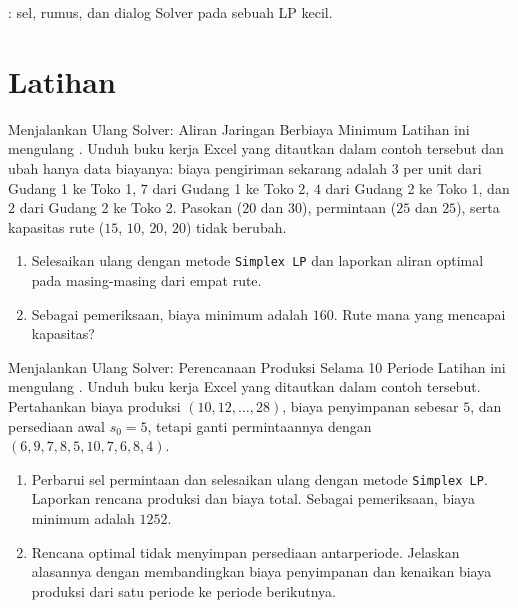 \begin{tryit}
: sel, rumus, dan dialog Solver pada sebuah LP kecil.
\end{tryit}


\section{Latihan}


\begin{ex}{Menjalankan Ulang Solver: Aliran Jaringan Berbiaya Minimum}{}
\label{ex:excel-network-flow-rerun}
 Latihan ini mengulang \OOExcelNetworkFlowExampleReference. Unduh buku kerja Excel yang ditautkan dalam contoh tersebut dan ubah hanya data biayanya: biaya pengiriman sekarang adalah $3$ per unit dari Gudang 1 ke Toko 1, $7$ dari Gudang 1 ke Toko 2, $4$ dari Gudang 2 ke Toko 1, dan $2$ dari Gudang 2 ke Toko 2. Pasokan ($20$ dan $30$), permintaan ($25$ dan $25$), serta kapasitas rute ($15$, $10$, $20$, $20$) tidak berubah.
\begin{enumerate}
\item Selesaikan ulang dengan metode \texttt{Simplex LP} dan laporkan aliran optimal pada masing-masing dari empat rute.
\item Sebagai pemeriksaan, biaya minimum adalah $160$. Rute mana yang mencapai kapasitas?
\end{enumerate}
\exrefs{\S\ref{sec:excel-solver}, \OOExcelNetworkFlowExampleReference}
\end{ex}

\begin{ex}{Menjalankan Ulang Solver: Perencanaan Produksi Selama 10 Periode}{}
\label{ex:excel-production-rerun}
 Latihan ini mengulang \OOExcelProductionExampleReference. Unduh buku kerja Excel yang ditautkan dalam contoh tersebut. Pertahankan biaya produksi $(10, 12, \dots, 28)$, biaya penyimpanan sebesar $5$, dan persediaan awal $s_0 = 5$, tetapi ganti permintaannya dengan $(6, 9, 7, 8, 5, 10, 7, 6, 8, 4)$.
\begin{enumerate}
\item Perbarui sel permintaan dan selesaikan ulang dengan metode \texttt{Simplex LP}. Laporkan rencana produksi dan biaya total. Sebagai pemeriksaan, biaya minimum adalah $1252$.
\item Rencana optimal tidak menyimpan persediaan antarperiode. Jelaskan alasannya dengan membandingkan biaya penyimpanan dan kenaikan biaya produksi dari satu periode ke periode berikutnya.
\end{enumerate}
\exrefs{\S\ref{sec:excel-solver}, \OOExcelProductionExampleReference}
\end{ex}

